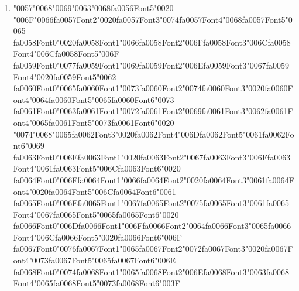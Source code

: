\documentclass[12pt]{article}
\begin{document}
\begin{enumerate}[label=Q\arabic*.]
\item {\char"0057}{\char"0068}{\char"0069}{\char"0063}{\char"0068}{\csname fa0056Font5\endcsname\char"0020} {\char"006F}{\char"0066}{\csname fa0057Font2\endcsname\char"0020}{\csname fa0057Font3\endcsname\char"0074}{\csname fa0057Font4\endcsname\char"0068}{\csname fa0057Font5\endcsname\char"0065} {\csname fa0058Font0\endcsname\char"0020}{\csname fa0058Font1\endcsname\char"0066}{\csname fa0058Font2\endcsname\char"006F}{\csname fa0058Font3\endcsname\char"006C}{\csname fa0058Font4\endcsname\char"006C}{\csname fa0058Font5\endcsname\char"006F} {\csname fa0059Font0\endcsname\char"0077}{\csname fa0059Font1\endcsname\char"0069}{\csname fa0059Font2\endcsname\char"006E}{\csname fa0059Font3\endcsname\char"0067}{\csname fa0059Font4\endcsname\char"0020}{\csname fa0059Font5\endcsname\char"0062} {\csname fa0060Font0\endcsname\char"0065}{\csname fa0060Font1\endcsname\char"0073}{\csname fa0060Font2\endcsname\char"0074}{\csname fa0060Font3\endcsname\char"0020}{\csname fa0060Font4\endcsname\char"0064}{\csname fa0060Font5\endcsname\char"0065}{\csname fa0060Font6\endcsname\char"0073} {\csname fa0061Font0\endcsname\char"0063}{\csname fa0061Font1\endcsname\char"0072}{\csname fa0061Font2\endcsname\char"0069}{\csname fa0061Font3\endcsname\char"0062}{\csname fa0061Font4\endcsname\char"0065}{\csname fa0061Font5\endcsname\char"0073}{\csname fa0061Font6\endcsname\char"0020} {\char"0074}{\char"0068}{\char"0065}{\csname fa0062Font3\endcsname\char"0020}{\csname fa0062Font4\endcsname\char"006D}{\csname fa0062Font5\endcsname\char"0061}{\csname fa0062Font6\endcsname\char"0069} {\csname fa0063Font0\endcsname\char"006E}{\csname fa0063Font1\endcsname\char"0020}{\csname fa0063Font2\endcsname\char"0067}{\csname fa0063Font3\endcsname\char"006F}{\csname fa0063Font4\endcsname\char"0061}{\csname fa0063Font5\endcsname\char"006C}{\csname fa0063Font6\endcsname\char"0020} {\csname fa0064Font0\endcsname\char"006F}{\csname fa0064Font1\endcsname\char"0066}{\csname fa0064Font2\endcsname\char"0020}{\csname fa0064Font3\endcsname\char"0061}{\csname fa0064Font4\endcsname\char"0020}{\csname fa0064Font5\endcsname\char"006C}{\csname fa0064Font6\endcsname\char"0061} {\csname fa0065Font0\endcsname\char"006E}{\csname fa0065Font1\endcsname\char"0067}{\csname fa0065Font2\endcsname\char"0075}{\csname fa0065Font3\endcsname\char"0061}{\csname fa0065Font4\endcsname\char"0067}{\csname fa0065Font5\endcsname\char"0065}{\csname fa0065Font6\endcsname\char"0020} {\csname fa0066Font0\endcsname\char"006D}{\csname fa0066Font1\endcsname\char"006F}{\csname fa0066Font2\endcsname\char"0064}{\csname fa0066Font3\endcsname\char"0065}{\csname fa0066Font4\endcsname\char"006C}{\csname fa0066Font5\endcsname\char"0020}{\csname fa0066Font6\endcsname\char"006F} {\csname fa0067Font0\endcsname\char"0076}{\csname fa0067Font1\endcsname\char"0065}{\csname fa0067Font2\endcsname\char"0072}{\csname fa0067Font3\endcsname\char"0020}{\csname fa0067Font4\endcsname\char"0073}{\csname fa0067Font5\endcsname\char"0065}{\csname fa0067Font6\endcsname\char"006E} {\csname fa0068Font0\endcsname\char"0074}{\csname fa0068Font1\endcsname\char"0065}{\csname fa0068Font2\endcsname\char"006E}{\csname fa0068Font3\endcsname\char"0063}{\csname fa0068Font4\endcsname\char"0065}{\csname fa0068Font5\endcsname\char"0073}{\csname fa0068Font6\endcsname\char"003F}

\end{enumerate}
\end{document}
